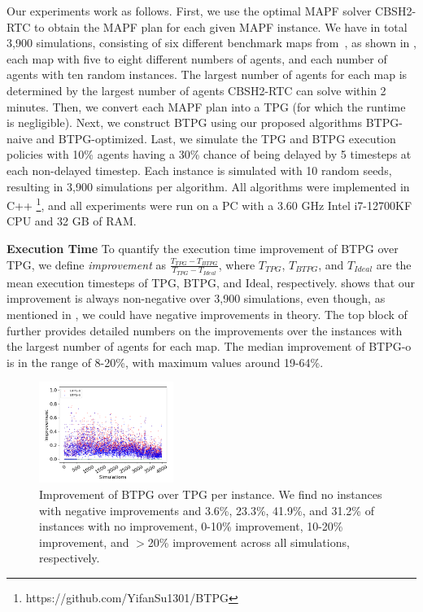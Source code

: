 \documentclass[letterpaper]{article} %
\theoremstyle{definition}
\begin{document}
Our experiments work as follows. First, we use the optimal MAPF solver CBSH2-RTC \cite{li_pairwise_2021} to obtain the MAPF plan for each given MAPF instance. We have in total 3,900 simulations, consisting of six different benchmark maps from~\cite{stern_multi-agent_2021}, as shown in , each map with five to eight different numbers of agents, and each number of agents with ten random instances. The largest number of agents for each map is determined by the largest number of agents CBSH2-RTC can solve within 2 minutes.
Then, we convert each MAPF plan into a TPG (for which the runtime is negligible).
Next, we construct BTPG using our proposed algorithms BTPG-naive and BTPG-optimized. Last, we simulate the TPG and BTPG execution policies with 10\% agents having a 30\% chance of being delayed by 5 timesteps at each non-delayed timestep. Each instance is simulated with 10 random seeds, resulting in 3,900 simulations per algorithm.
All algorithms were implemented in C++ \footnote{https://github.com/YifanSu1301/BTPG}, and all experiments were run on a PC with a 3.60 GHz Intel i7-12700KF CPU and 32 GB of RAM.


\textbf{Execution Time} 
To quantify the execution time improvement of BTPG over TPG, we define \emph{improvement} as $\frac{T_{TPG} - T_{BTPG}}{T_{TPG}-T_{Ideal}}$, where $T_{TPG}$, $T_{BTPG}$, and $T_{Ideal}$ are the mean execution timesteps of TPG, BTPG, and Ideal, respectively.  shows that our improvement is always non-negative over 3,900 simulations, even though, as mentioned in , we could have negative improvements in theory. The top block of  further provides detailed numbers on the improvements over the instances with the largest number of agents for each map. The median improvement of BTPG-o is in the range of 8-20\%, with maximum values around 19-64\%.


\begin{figure}[t!]
\centering
\includegraphics[width=0.39\textwidth]{Figs/scatter.png}
\caption{Improvement of BTPG over TPG per instance. We find no instances with negative improvements and 3.6\%, 23.3\%,  41.9\%, and 31.2\% of instances with no improvement, 0-10\% improvement, 10-20\% improvement, and $>$20\% improvement across all simulations, respectively.}
\label{fig:scatter plot}
\end{figure}
\end{document}
